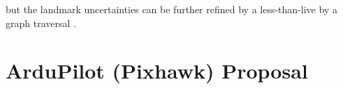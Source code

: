 \documentclass{article}
\begin{document}
\begin{appendices}
    but the landmark uncertainties can be further refined by a less-than-live by a graph traversal \cite{SLAMgraph}.




  \section{ArduPilot (Pixhawk) Proposal} \label{sec:PihawkProposal}
    

\end{appendices}

  
\end{document}
